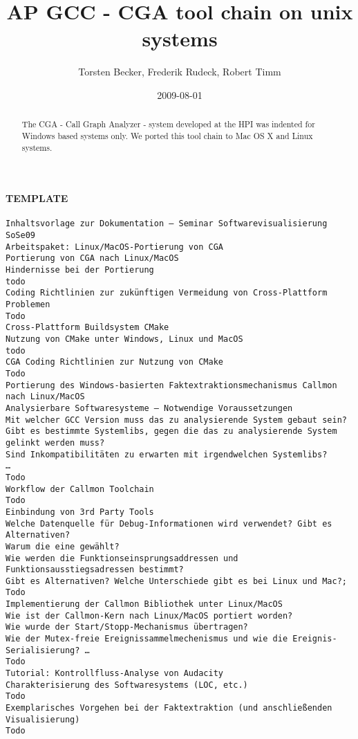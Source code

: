 \documentclass[]{article}
\title{AP GCC - CGA tool chain on unix systems}
\author{ Torsten Becker, Frederik Rudeck, Robert Timm }
\date{2009-08-01}
\begin{document}
\lstset{language=C++}

\ifpdf {} \else {} \fi

\maketitle
\begin{abstract}
	The CGA - Call Graph Analyzer - system developed at the HPI was indented for Windows based systems only. We ported this tool chain to Mac OS X and Linux systems.
\end{abstract}


\paragraph{TEMPLATE}
\begin{verbatim}
Inhaltsvorlage zur Dokumentation – Seminar Softwarevisualisierung SoSe09
Arbeitspaket: Linux/MacOS-Portierung von CGA
Portierung von CGA nach Linux/MacOS
Hindernisse bei der Portierung
todo
Coding Richtlinien zur zukünftigen Vermeidung von Cross-Plattform Problemen
Todo
Cross-Plattform Buildsystem CMake
Nutzung von CMake unter Windows, Linux und MacOS
todo
CGA Coding Richtlinien zur Nutzung von CMake
Todo
Portierung des Windows-basierten Faktextraktionsmechanismus Callmon nach Linux/MacOS
Analysierbare Softwaresysteme – Notwendige Voraussetzungen
Mit welcher GCC Version muss das zu analysierende System gebaut sein?
Gibt es bestimmte Systemlibs, gegen die das zu analysierende System gelinkt werden muss?
Sind Inkompatibilitäten zu erwarten mit irgendwelchen Systemlibs?
…
Todo
Workflow der Callmon Toolchain
Todo
Einbindung von 3rd Party Tools 
Welche Datenquelle für Debug-Informationen wird verwendet? Gibt es Alternativen? 
Warum die eine gewählt?
Wie werden die Funktionseinsprungsaddressen und Funktionsausstiegsadressen bestimmt? 
Gibt es Alternativen? Welche Unterschiede gibt es bei Linux und Mac?; Todo
Implementierung der Callmon Bibliothek unter Linux/MacOS
Wie ist der Callmon-Kern nach Linux/MacOS portiert worden? 
Wie wurde der Start/Stopp-Mechanismus übertragen? 
Wie der Mutex-freie Ereignissammelmechenismus und wie die Ereignis-Serialisierung? …
Todo
Tutorial: Kontrollfluss-Analyse von Audacity
Charakterisierung des Softwaresystems (LOC, etc.)
Todo
Exemplarisches Vorgehen bei der Faktextraktion (und anschließenden Visualisierung)
Todo
\end{verbatim}
\end{document}
